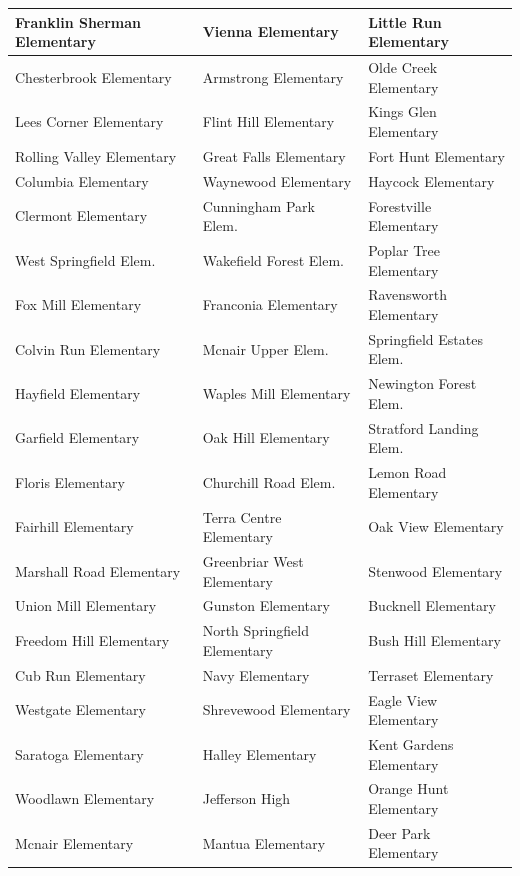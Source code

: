 \documentclass{scrartcl}
\begin{document}
\begin{longtable}{|>{\raggedright\arraybackslash}p{}|>{\raggedright\arraybackslash}p{}|>{\raggedright\arraybackslash}p{}|}
    Franklin Sherman Elementary & Vienna Elementary & Little Run Elementary \\
    \hline
    Chesterbrook Elementary & Armstrong Elementary & Olde Creek Elementary \\
    \hline
    Lees Corner Elementary & Flint Hill Elementary & Kings Glen Elementary \\
    \hline
    Rolling Valley Elementary & Great Falls Elementary & Fort Hunt Elementary \\
    \hline
    Columbia Elementary & Waynewood Elementary & Haycock Elementary \\
    \hline
    Clermont Elementary & Cunningham Park Elem. & Forestville Elementary \\ 
    \hline
    West Springfield Elem. & Wakefield Forest Elem. & Poplar Tree Elementary \\ 
    \hline
    Fox Mill Elementary & Franconia Elementary & Ravensworth Elementary \\ 
    \hline
    Colvin Run Elementary & Mcnair Upper Elem. & Springfield Estates Elem. \\ 
    \hline
    Hayfield Elementary & Waples Mill Elementary & Newington Forest Elem. \\ 
    \hline
    Garfield Elementary & Oak Hill Elementary & Stratford Landing Elem. \\ 
    \hline
    Floris Elementary & Churchill Road Elem. & Lemon Road Elementary \\ 
    \hline
    Fairhill Elementary & Terra Centre Elementary & Oak View Elementary \\
    \hline
    Marshall Road Elementary & Greenbriar West Elementary & Stenwood Elementary \\
    \hline
    Union Mill Elementary & Gunston Elementary & Bucknell Elementary \\
    \hline
    Freedom Hill Elementary & North Springfield Elementary & Bush Hill Elementary \\
    \hline
    Cub Run Elementary & Navy Elementary & Terraset Elementary \\
    \hline
    Westgate Elementary & Shrevewood Elementary & Eagle View Elementary \\
    \hline
    Saratoga Elementary & Halley Elementary & Kent Gardens Elementary \\
    \hline
    Woodlawn Elementary & Jefferson High & Orange Hunt Elementary \\
    \hline
    Mcnair Elementary & Mantua Elementary & Deer Park Elementary \\

\end{longtable}
\end{document}
